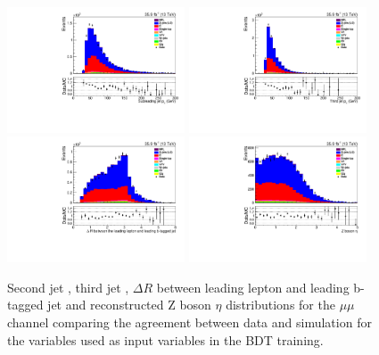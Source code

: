 \begin{figure}[htb]
\centering
\includegraphics[width=0.47\textwidth]{figs/background-estimation/plots/unblinded/prompt_mumu_ttbarInc/secondJetPt_NPL_mumu_wMass_mumu.pdf}
\includegraphics[width=0.47\textwidth]{figs/background-estimation/plots/unblinded/prompt_mumu_ttbarInc/thirdJetPt_NPL_mumu_wMass_mumu.pdf}
\\
\includegraphics[width=0.47\textwidth]{figs/background-estimation/plots/unblinded/prompt_mumu_ttbarInc/zLep1BjetDelR_NPL_mumu_wMass_mumu.pdf}
\includegraphics[width=0.47\textwidth]{figs/background-estimation/plots/unblinded/prompt_mumu_ttbarInc/zPairEta_NPL_mumu_wMass_mumu.pdf}
\caption{
Second jet \pt, third jet \pT, $\Delta R$ between leading lepton and leading b-tagged jet and reconstructed Z boson $\eta$ distributions for the $\mu\mu$ channel comparing the agreement between data and simulation for the variables used as input variables in the BDT training.}
\label{fig:appInputFeaturesDataSimAgreement13}
\end{figure}
